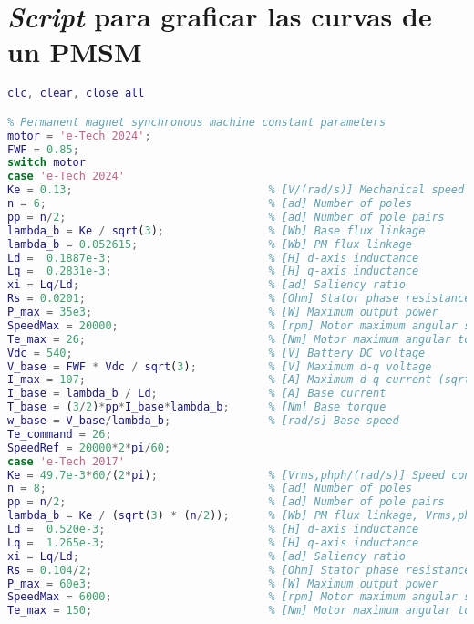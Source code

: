 \section{\textit{Script} para graficar las curvas de un PMSM}
\begin{lstlisting}[language=Matlab, basicstyle=\ttfamily\small, breaklines=true, frame=single]
clc, clear, close all

% Permanent magnet synchronous machine constant parameters
motor = 'e-Tech 2024';
FWF = 0.85;
switch motor
case 'e-Tech 2024'
Ke = 0.13;                              % [V/(rad/s)] Mechanical speed constant
n = 6;                                  % [ad] Number of poles 
pp = n/2;                               % [ad] Number of pole pairs
lambda_b = Ke / sqrt(3);                % [Wb] Base flux linkage
lambda_b = 0.052615;                    % [Wb] PM flux linkage
Ld =  0.1887e-3;                        % [H] d-axis inductance
Lq =  0.2831e-3;                        % [H] q-axis inductance
xi = Lq/Ld;                             % [ad] Saliency ratio
Rs = 0.0201;                            % [Ohm] Stator phase resistance (phase-to-phase/2)
P_max = 35e3;                           % [W] Maximum output power
SpeedMax = 20000;                       % [rpm] Motor maximum angular speed
Te_max = 26;                            % [Nm] Motor maximum angular torque
Vdc = 540;                              % [V] Battery DC voltage
V_base = FWF * Vdc / sqrt(3);           % [V] Maximum d-q voltage
I_max = 107;                            % [A] Maximum d-q current (sqrt(i_d^2+i_q^2))
I_base = lambda_b / Ld;                 % [A] Base current
T_base = (3/2)*pp*I_base*lambda_b;      % [Nm] Base torque
w_base = V_base/lambda_b;               % [rad/s] Base speed
Te_command = 26;
SpeedRef = 20000*2*pi/60;  
case 'e-Tech 2017'
Ke = 49.7e-3*60/(2*pi);                 % [Vrms,phph/(rad/s)] Speed constant, Vrms,phph/wm
n = 8;                                  % [ad] Number of poles 
pp = n/2;                               % [ad] Number of pole pairs
lambda_b = Ke / (sqrt(3) * (n/2));      % [Wb] PM flux linkage, Vrms,phn/we
Ld =  0.520e-3;                         % [H] d-axis inductance
Lq =  1.265e-3;                         % [H] q-axis inductance
xi = Lq/Ld;                             % [ad] Saliency ratio
Rs = 0.104/2;                           % [Ohm] Stator phase resistance (phase-to-phase/2)
P_max = 60e3;                           % [W] Maximum output power
SpeedMax = 6000;                        % [rpm] Motor maximum angular speed
Te_max = 150;                           % [Nm] Motor maximum angular torque

\end{lstlisting}
